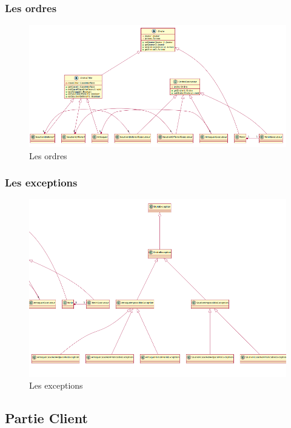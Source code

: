 		\subsubsection{Les ordres}
			\begin{figure}[!h]
				\centering
				\includegraphics[scale=0.5]{images/DCP2.png}
				\caption{Les ordres}
			\end{figure}

		\subsubsection{Les exceptions}
			\vspace{10mm}
			\begin{figure}[!h]
				\centering
				\includegraphics[scale=0.5]{images/DCP3.png}
				\caption{Les exceptions}
			\end{figure}
		\newpage
	\subsection{Partie Client}

